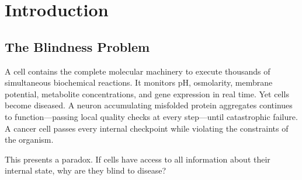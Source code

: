 \documentclass[10pt,twocolumn,a4paper]{article}
\theoremstyle{plain}
\theoremstyle{definition}
\theoremstyle{remark}
\begin{document}
\begin{abstract}
We prove three principal results. First, that the No Template Theorem holds universally: no bounded system can store a complete self-representation, and this applies equally to cells, simulations, and experimental observers (Theorem~\ref{thm:no_template}). Second, that disease corresponds to topological inconsistency---closed loops in the circuit graph whose holonomy is non-trivial, detectable purely from self-consistency without any reference state (Theorem~\ref{thm:disease_inconsistency}). Third, that such inconsistencies are locally undetectable: each individual step passes validation, yet the global circuit fails (Theorem~\ref{thm:local_invisibility}). We derive a trajectory completion algorithm that converges to a unique fixed point by the Banach contraction principle, combining fuzzy Kirchhoff propagation with MAP backward-trajectory inference. Disease detection reduces to checking whether the constraint system admits a self-consistent solution; drug design reduces to sparse conductance modification via $\ell_1$ optimisation. The framework is validated against glycolytic flux data, mitochondrial dysfunction cascades, and protein misfolding disease progression.
\end{abstract}

\section{Introduction}
\label{sec:introduction}

\subsection{The Blindness Problem}

A cell contains the complete molecular machinery to execute thousands of simultaneous biochemical reactions. It monitors pH, osmolarity, membrane potential, metabolite concentrations, and gene expression in real time. Yet cells become diseased. A neuron accumulating misfolded protein aggregates continues to function---passing local quality checks at every step---until catastrophic failure. A cancer cell passes every internal checkpoint while violating the constraints of the organism.

This presents a paradox. If cells have access to all information about their internal state, why are they blind to disease?
\end{document}
